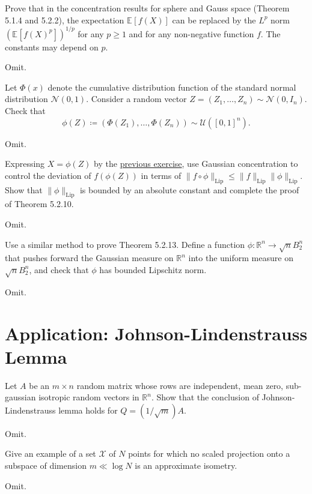 \begin{problem*}[Exercise 5.2.4]\label{ex5.2.4}
	Prove that in the concentration results for sphere and Gauss space (Theorem 5.1.4 and 5.2.2), the expectation \(\mathbb{E}_{}[f(X)] \) can be replaced by the \(L^p\) norm \((\mathbb{E}_{}[f(X)^p] )^{1 / p}\) for any \(p \geq 1\) and for any non-negative function \(f\). The constants may depend on \(p\).
\end{problem*}
\begin{answer}
	Omit.
\end{answer}

\begin{problem*}[Exercise 5.2.11]\label{ex5.2.11}
	Let \(\Phi (x)\) denote the cumulative distribution function of the standard normal distribution \(\mathcal{N} (0, 1)\). Consider a random vector \(Z = (Z_1, \dots , Z_n) \sim \mathcal{N} (0, I_n)\). Check that
	\[
		\phi (Z)
		\coloneqq \left( \Phi (Z_1), \dots , \Phi (Z_n) \right) \sim \mathcal{U} ([0, 1]^n).
	\]
\end{problem*}
\begin{answer}
	Omit.
\end{answer}

\begin{problem*}[Exercise 5.2.12]\label{ex5.2.12}
	Expressing \(X = \phi (Z)\) by the \hyperref[ex5.2.11]{previous exercise}, use Gaussian concentration to control the deviation of \(f(\phi (Z))\) in terms of \(\lVert f \circ \phi \rVert _{\mathrm{Lip} } \leq \lVert f \rVert _{\mathrm{Lip} } \lVert \phi \rVert _{\mathrm{Lip} }\). Show that \(\lVert \phi \rVert _{\mathrm{Lip} }\) is bounded by an absolute constant and complete the proof of Theorem 5.2.10.
\end{problem*}
\begin{answer}
	Omit.
\end{answer}

\begin{problem*}[Exercise 5.2.14]\label{ex5.2.14}
	Use a similar method to prove Theorem 5.2.13. Define a function \(\phi \colon \mathbb{R} ^n \to \sqrt{n} B^n_2\) that pushes forward the Gaussian measure on \(\mathbb{R} ^n\) into the uniform measure on \(\sqrt{n} B^n_2\), and check that \(\phi \) has bounded Lipschitz norm.
\end{problem*}
\begin{answer}
	Omit.
\end{answer}

\section{Application: Johnson-Lindenstrauss Lemma}
\begin{problem*}[Exercise 5.3.3]\label{ex5.3.3}
	Let \(A\) be an \(m \times n\) random matrix whose rows are independent, mean zero, sub-gaussian isotropic random vectors in \(\mathbb{R} ^n\). Show that the conclusion of Johnson-Lindenstrauss lemma holds for \(Q = (1 / \sqrt{m} )A\).
\end{problem*}
\begin{answer}
	Omit.
\end{answer}

\begin{problem*}[Exercise 5.3.4]\label{ex5.3.4}
	Give an example of a set \(\mathcal{X} \) of \(N\) points for which no scaled projection onto a subspace of dimension \(m \ll \log N\) is an approximate isometry.
\end{problem*}
\begin{answer}
	Omit.
\end{answer}